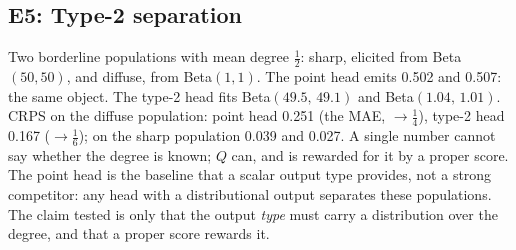 \documentclass[11pt,a4paper]{article}
\numberwithin{equation}{section}
\theoremstyle{plain}
\theoremstyle{definition}
\theoremstyle{remark}
\begin{document}
\subsection{E5: Type-2 separation}
Two borderline populations with mean degree $\tfrac12$: sharp, elicited from Beta$(50,50)$, and diffuse, from Beta$(1,1)$. The point head emits 0.502 and 0.507: the same object. The type-2 head fits Beta$(49.5,\,49.1)$ and Beta$(1.04,\,1.01)$. CRPS on the diffuse population: point head 0.251 (the MAE, $\to\tfrac14$), type-2 head 0.167 ($\to\tfrac16$); on the sharp population 0.039 and 0.027. A single number cannot say whether the degree is known; $Q$ can, and is rewarded for it by a proper score. The point head is the baseline that a scalar output type provides, not a strong competitor: any head with a distributional output separates these populations. The claim tested is only that the output \emph{type} must carry a distribution over the degree, and that a proper score rewards it.
\end{document}
